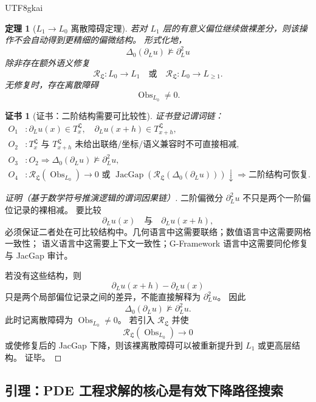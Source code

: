\documentclass[12pt]{article}
\newtheorem{theorem}{定理}[section]
\newtheorem{Certificate}{证书}[section]
\newcommand{\GFramework}{\textsf{G-Framework}}
\DeclareMathOperator{\JacGap}{JacGap}
\DeclareMathOperator{\Obs}{Obs}
\begin{document}
\begin{CJK*}{UTF8}{gkai}
\begin{theorem}[\(L_1\to L_0\) 离散障碍定理]
\label{thm:tex58-l0-obstruction}
若对 \(L_1\) 层的有意义偏位继续做裸差分，则该操作不会自动得到更精细的偏微结构。
形式化地，
\[
  \Delta_0(\partial_Lu)
  \not\models
  \partial_L^2u
\]
除非存在额外语义修复
\[
  \mathcal R_{\mathfrak L}:L_0\to L_1
  \quad\text{或}\quad
  \mathcal R_{\mathfrak L}:L_0\to L_{\ge1}.
\]
无修复时，存在离散障碍
\[
  \Obs_{L_0}\ne0.
\]
\end{theorem}

\begin{Certificate}[证书：二阶结构需要可比较性]
\label{cert:tex58-l0-obstruction}
证书登记谓词链：
\[
\begin{aligned}
  O_1 &: \partial_Lu(x)\in T_x^{\mathfrak L},\quad
         \partial_Lu(x+h)\in T_{x+h}^{\mathfrak L},\\
  O_2 &: T_x^{\mathfrak L}\text{ 与 }T_{x+h}^{\mathfrak L}\text{ 未给出联络/坐标/语义兼容时不可直接相减},\\
  O_3 &: O_2\Rightarrow \Delta_0(\partial_Lu)\not\models\partial_L^2u,\\
  O_4 &: \mathcal R_{\mathfrak L}(\Obs_{L_0})\to0
         \text{ 或 }\JacGap(\mathcal R_{\mathfrak L}(\Delta_0(\partial_Lu)))\downarrow
         \Rightarrow \text{二阶结构可恢复}.
\end{aligned}
\]
\end{Certificate}

\begin{proof}[证明（基于数学符号推演逻辑的谓词因果链）]
二阶偏微分 \(\partial_L^2u\) 不只是两个一阶偏位记录的裸相减。
要比较
\[
  \partial_Lu(x)
  \quad\text{与}\quad
  \partial_Lu(x+h),
\]
必须保证二者处在可比较结构中。几何语言中这需要联络；数值语言中这需要网格一致性；
语义语言中这需要上下文一致性；\GFramework{} 语言中这需要同伦修复与 JacGap 审计。

若没有这些结构，则
\[
  \partial_Lu(x+h)-\partial_Lu(x)
\]
只是两个局部偏位记录之间的差异，不能直接解释为 \(\partial_L^2u\)。
因此
\[
  \Delta_0(\partial_Lu)\not\models\partial_L^2u.
\]
此时记离散障碍为 \(\Obs_{L_0}\ne0\)。
若引入 \(\mathcal R_{\mathfrak L}\) 并使
\[
  \mathcal R_{\mathfrak L}(\Obs_{L_0})\to0
\]
或使修复后的 JacGap 下降，则该裸离散障碍可以被重新提升到 \(L_1\) 或更高层结构。
证毕。
\end{proof}

\subsection{引理：PDE 工程求解的核心是有效下降路径搜索}
\label{subsec:tex58-pde-descent-search-lemma}


\end{CJK*}
\end{document}
